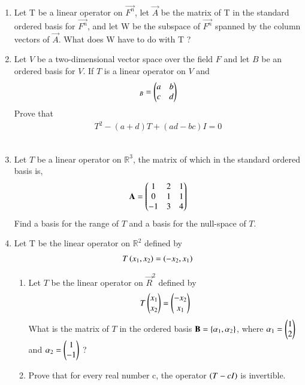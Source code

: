 \begin{enumerate}[label=\thesubsection.\arabic*.,ref=\thesubsection.\theenumi]
\item Let T be a linear operator on $\vec{F^n}$, let $\vec{A}$ be the matrix of T in the standard ordered basis for $\vec{F^n}$, and let W be the subspace of $\vec{F^n}$ spanned by the column vectors of $\vec{A}$. What does W have to do with T ?
%
\\
\solution

%
\item Let $V$ be a two-dimensional vector space over the field $F$ and let $B$ be an ordered basis for $V$. If $T$ is a linear operator on $V$ and 
\begin{align}
[T]_B = \myvec{a & b\\c & d}
\end{align}
Prove that 
\begin{align}
T^2 - (a+d)T + (ad-bc)I = 0
\end{align}
%
\\
\solution

\item Let $T$ be a linear operator on $\mathbb{R}^3$, the matrix of which in the standard ordered basis is,
\begin{align}
\mathbf{A} = \begin{pmatrix}1&2&1\\0&1&1\\-1&3&4\end{pmatrix} 
\end{align}
Find a basis for the range of $T$ and a basis for the null-space of $T$.
%
\\
\solution

\item Let T be the linear operator on $\mathbb{R}^2$ defined by
\begin{align}
T\left(x_1,x_2\right)=\left(-x_2,x_1\right)\label{eq:solutions/3/4/6/c/Tx}
\end{align}
\begin{enumerate}
\item  	Let $T$ be the linear operator on $\vec{R}^2$ defined by 
	\begin{align}
		T\begin{pmatrix}x_1\\ x_2\end{pmatrix} = \begin{pmatrix}-x_2\\ x_1\end{pmatrix} 
	\end{align}
	What is the matrix of $T$ in the ordered basis $\mathbf{B} = \left\{ \mathbf{ \alpha }_1, \mathbf{\alpha}_2\right\}$, where $\mathbf{\alpha}_1 = \begin{pmatrix}1\\ 2\end{pmatrix}$ and $\mathbf{\alpha}_2 = \begin{pmatrix}1 \\ -1\end{pmatrix}$ ?
%
\\
\solution

\item Prove that for every real number c, the operator $\left(T-cI\right)$ is invertible.

\end{enumerate}
\end{enumerate}
